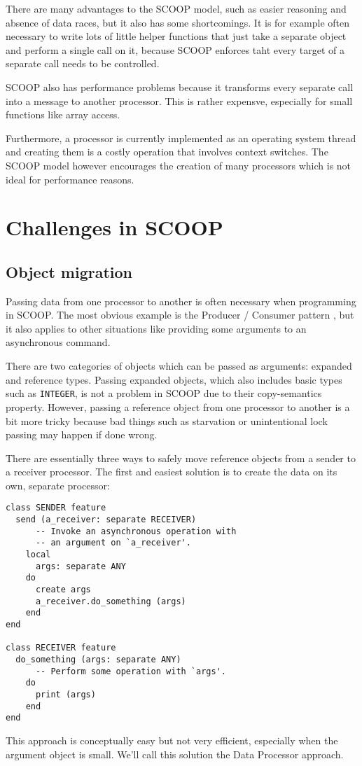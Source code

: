 There are many advantages to the SCOOP model, such as easier reasoning and absence of data races, but it also has some shortcomings.
It is for example often necessary to write lots of little helper functions that just take a separate object and perform a single call on it,
because SCOOP enforces taht every target of a separate call needs to be controlled.

SCOOP also has performance problems because it transforms every separate call into a message to another processor.
This is rather expensve, especially for small functions like array access.

Furthermore, a processor is currently implemented as an operating system thread and creating them is a costly operation that involves context switches.
The SCOOP model however encourages the creation of many processors which is not ideal for performance reasons.

\section{Challenges in SCOOP}
\label{sec:scoop-challenges}

\subsection{Object migration}
\label{sec:object-migration}

Passing data from one processor to another is often necessary when programming in SCOOP.
The most obvious example is the Producer / Consumer pattern , but it also applies to other situations like providing some arguments to an asynchronous command.

There are two categories of objects which can be passed as arguments: expanded and reference types.
Passing expanded objects, which also includes basic types such as \lstinline!INTEGER!, is not a problem in SCOOP due to their copy-semantics property.
However, passing a reference object from one processor to another is a bit more tricky
because bad things such as starvation or unintentional lock passing may happen if done wrong.

There are essentially three ways to safely move reference objects from a sender to a receiver processor.
The first and easiest solution is to create the data on its own, separate processor: 
\begin{lstlisting}[language=OOSC2Eiffel, captionpos=b, caption={Migrate objects on a separate processor.}]
class SENDER feature
  send (a_receiver: separate RECEIVER)
      -- Invoke an asynchronous operation with
      -- an argument on `a_receiver'.
    local
      args: separate ANY
    do
      create args
      a_receiver.do_something (args)
    end
end

class RECEIVER feature 
  do_something (args: separate ANY)
      -- Perform some operation with `args'.
    do
      print (args)
    end
end
\end{lstlisting}
This approach is conceptually easy but not very efficient, especially when the argument object is small.
We'll call this solution the Data Processor approach.


